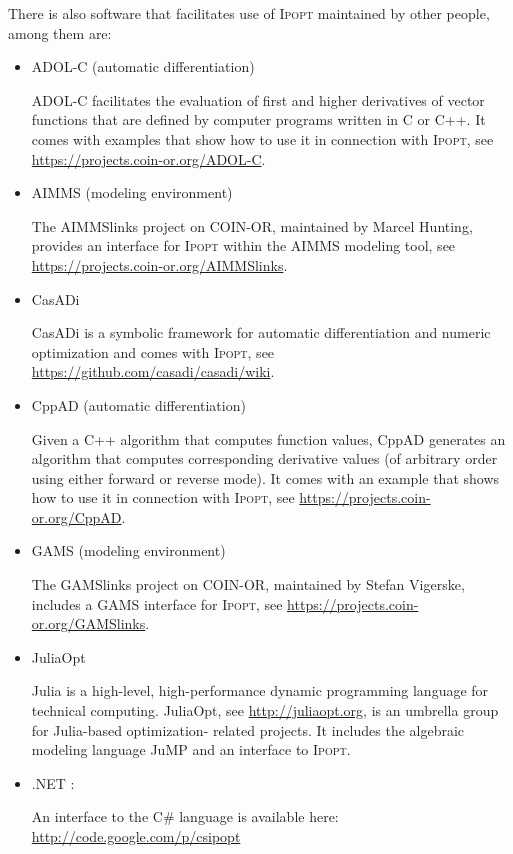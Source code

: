 \documentclass[10pt]{article}
\newcommand{\Ipopt}{\textsc{Ipopt}\xspace}
\begin{document}
There is also software that facilitates use of \Ipopt maintained by other people, among them are:
\begin{itemize}
\item ADOL-C (automatic differentiation)

  ADOL-C facilitates the evaluation of first and higher derivatives of
  vector functions that are defined by computer programs written in C or C++.
  It comes with examples that show how to use it in connection with \Ipopt, see
  \url{https://projects.coin-or.org/ADOL-C}.
    
\item AIMMS (modeling environment)

  The AIMMSlinks project on COIN-OR, maintained by Marcel Hunting,
  provides an interface for \Ipopt within the AIMMS modeling tool, see
  \url{https://projects.coin-or.org/AIMMSlinks}.
  
\item CasADi

  CasADi is a symbolic framework for automatic differentiation and
  numeric optimization and comes with \Ipopt, see
  \url{https://github.com/casadi/casadi/wiki}.

\item CppAD (automatic differentiation)

  Given a C++ algorithm that computes function values, CppAD generates an
  algorithm that computes corresponding derivative values (of arbitrary
  order using either forward or reverse mode).
  It comes with an example that shows how to use it in connection with \Ipopt, see
  \url{https://projects.coin-or.org/CppAD}.

\item GAMS (modeling environment)

  The GAMSlinks project on COIN-OR, maintained by Stefan Vigerske,
  includes a GAMS interface for \Ipopt, see
  \url{https://projects.coin-or.org/GAMSlinks}.
  
\item JuliaOpt

  Julia is a high-level, high-performance dynamic programming language for technical computing.
  JuliaOpt, see \url{http://juliaopt.org}, is an umbrella group for Julia-based optimization-
  related projects. It includes the algebraic modeling language JuMP and an interface to \Ipopt.

\item .NET :
  
  An interface to the C\# language is available here: 
  \url{http://code.google.com/p/csipopt}
  

\end{itemize}
\end{document}
